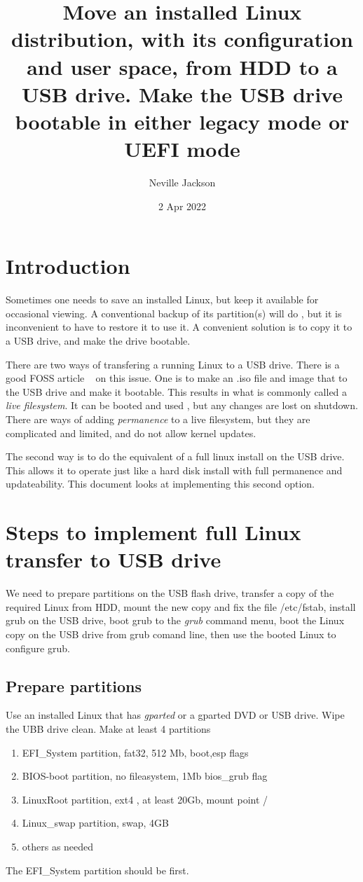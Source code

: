 \documentclass{article}  %
\title{Move an installed Linux distribution, with its configuration and user space, from HDD to a USB drive. Make the USB drive bootable in either legacy mode or UEFI mode}
\author{Neville Jackson}
\date{2 Apr 2022}
\begin{document}
 

\maketitle      

\section{Introduction} 
Sometimes one needs to save an installed Linux, but keep it available for occasional viewing. A conventional backup of its partition(s) will do , but it is inconvenient to have to restore it to use it. A convenient solution is to copy it to a USB drive, and make the drive bootable. 

There are two ways of transfering a running Linux to a USB drive. There is a good FOSS article ~\cite{foss:21} on this issue. One is to make an .iso file and image that to the USB drive and make it bootable. This results in what is commonly called a  {\em live filesystem}. It can be booted and used , but any changes are lost on shutdown. There are ways of adding {\em permanence} to a live filesystem, but they are complicated and limited, and do not allow kernel updates.

The second way  is to do  the equivalent of a full linux install on the USB drive. This allows it  to operate just like a hard disk install with full permanence and updateability. This document looks at implementing this second option.

\section{Steps to implement full Linux transfer to USB drive}
We need to prepare partitions on the USB flash drive, transfer a copy of the required Linux from HDD, mount the new copy and fix the file /etc/fstab, install grub on the USB drive, boot grub to the {\em grub} command menu, boot the Linux copy on the USB drive from grub comand line, then use the booted Linux to configure grub.

\subsection{Prepare partitions}
Use an installed Linux that has {\em gparted} or a gparted DVD or USB drive. Wipe the UBB drive clean. Make at least 4 partitions
\begin{enumerate}
\item EFI\_System  partition, fat32, 512 Mb, boot,esp flags
\item BIOS-boot partition, no fileasystem, 1Mb bios\_grub flag
\item LinuxRoot partition, ext4 , at least 20Gb, mount point /
\item Linux\_swap partition, swap, 4GB
\item others as needed
\end{enumerate}
The EFI\_System  partition should be first. 
\end{document}
